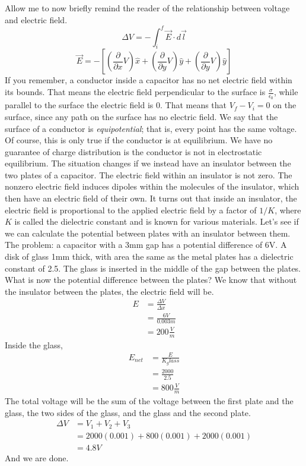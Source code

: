 \documentclass[nobib]{tufte-handout}
\begin{document}
Allow me to now briefly remind the reader of 
the relationship between voltage and electric field. 
\[\Delta V = -\int_{i}^{f} \vec{E}\cdot d\vec{l}\]
\[\vec{E} = - \left[ \left(\frac{\partial}{\partial x}V\right)\hat{x} + \left(\frac{\partial}{\partial y}V\right)\hat{y} + \left(\frac{\partial}{\partial y}V\right)\hat{y} \right]\]
If you remember, a conductor inside a capacitor
has no net electric field within its bounds. 
That means the electric field perpendicular to 
the surface is $\frac{\sigma}{\epsilon_0}$, while parallel 
to the surface the electric field is 0. 
That means that $V_f - V_i = 0$ on 
the surface, since any path on the surface has 
no electric field. We say that the surface of 
a conductor is \emph{equipotential}; that is, 
every point has the same voltage. Of course, this 
is only true if the conductor is at equilibrium.
We have no guarantee of charge distribution is the 
conductor is not in electrostatic equilibrium. 
The situation changes if we instead have an insulator 
between the two plates of a capacitor. The electric field 
within an insulator is not zero. The nonzero 
electric field induces dipoles within the molecules 
of the insulator, which then have an electric field of their own. 
It turns out that inside an insulator, the electric field is 
proportional to the applied electric field by a factor of $1/K$, 
where $K$ is called the dielectric constant and is known for various materials. 
Let's see if we can calculate the potential between plates with an insulator between 
them. The problem: a capacitor with a 3mm gap has a potential
difference of 6V. A disk of glass 1mm thick, with
area the same as the metal plates has a dielectric
constant of 2.5. The glass is inserted in the middle
of the gap between the plates. What is now the
potential difference between the plates? 
We know that without the insulator between the plates, the electric 
field will be. 
\begin{align*}
    E &= \frac{\Delta V}{\Delta x} \\
    &= \frac{6V}{0.003 m} \\
    &= 200 \frac{V}{m}
\end{align*}
Inside the glass, 
\begin{align*}
    E_{net} &= \frac{E}{K_glass} \\
    &= \frac{2000}{2.5} \\
    &= 800 \frac{V}{m}
\end{align*}
The total voltage will be the sum of the voltage 
between the first plate and the glass, the two sides of 
the glass, and the glass and the second plate. 
\begin{align*}
    \Delta V &= V_1 + V_2 + V_3 \\
    &= 2000(0.001) + 800(0.001) + 2000(0.001) \\
    &= 4.8 V
\end{align*}
And we are done. 
\end{document}
